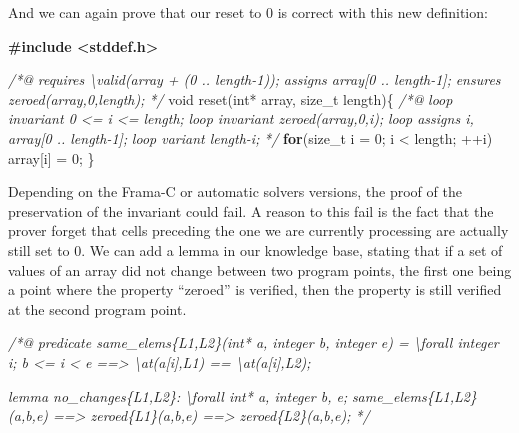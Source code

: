 \documentclass[12pt,francais,]{scrbook}
\newenvironment{Shaded}{}{}
\newcommand{\KeywordTok}[1]{\textcolor[rgb]{0.00,0.44,0.13}{\textbf{{#1}}}}
\newcommand{\DataTypeTok}[1]{\textcolor[rgb]{0.56,0.13,0.00}{{#1}}}
\newcommand{\DecValTok}[1]{\textcolor[rgb]{0.25,0.63,0.44}{{#1}}}
\newcommand{\CommentTok}[1]{\textcolor[rgb]{0.38,0.63,0.69}{\textit{{#1}}}}
\newcommand{\ErrorTok}[1]{\textcolor[rgb]{1.00,0.00,0.00}{\textbf{{#1}}}}
\newcommand{\NormalTok}[1]{{#1}}
\begin{document}
And we can again prove that our reset to 0 is correct with this new
definition:

\begin{footnotesize}\begin{Shaded}
\begin{Highlighting}[]
\ErrorTok{#include <stddef.h>}

\CommentTok{/*@}
\CommentTok{  requires \textbackslash{}valid(array + (0 .. length-1));}
\CommentTok{  assigns  array[0 .. length-1];}
\CommentTok{  ensures  zeroed(array,0,length);}
\CommentTok{*/}
\DataTypeTok{void} \NormalTok{reset(}\DataTypeTok{int}\NormalTok{* array, size_t length)\{}
  \CommentTok{/*@}
\CommentTok{    loop invariant 0 <= i <= length;}
\CommentTok{    loop invariant zeroed(array,0,i);}
\CommentTok{    loop assigns i, array[0 .. length-1];}
\CommentTok{    loop variant length-i;}
\CommentTok{  */}
  \KeywordTok{for}\NormalTok{(size_t i = }\DecValTok{0}\NormalTok{; i < length; ++i)}
    \NormalTok{array[i] = }\DecValTok{0}\NormalTok{;}
\NormalTok{\}}
\end{Highlighting}
\end{Shaded}\end{footnotesize}

Depending on the Frama-C or automatic solvers versions, the proof of the
preservation of the invariant could fail. A reason to this fail is the
fact that the prover forget that cells preceding the one we are
currently processing are actually still set to 0. We can add a lemma in
our knowledge base, stating that if a set of values of an array did not
change between two program points, the first one being a point where the
property ``zeroed'' is verified, then the property is still verified at
the second program point.

\begin{footnotesize}\begin{Shaded}
\begin{Highlighting}[]
\CommentTok{/*@}
\CommentTok{  predicate same_elems\{L1,L2\}(int* a, integer b, integer e) =}
\CommentTok{    \textbackslash{}forall integer i; b <= i < e ==> \textbackslash{}at(a[i],L1) == \textbackslash{}at(a[i],L2);}

\CommentTok{  lemma no_changes\{L1,L2\}:}
\CommentTok{    \textbackslash{}forall int* a, integer b, e;}
\CommentTok{      same_elems\{L1,L2\}(a,b,e) ==> zeroed\{L1\}(a,b,e) ==> zeroed\{L2\}(a,b,e);}
\CommentTok{*/}
\end{Highlighting}
\end{Shaded}\end{footnotesize}
\end{document}

